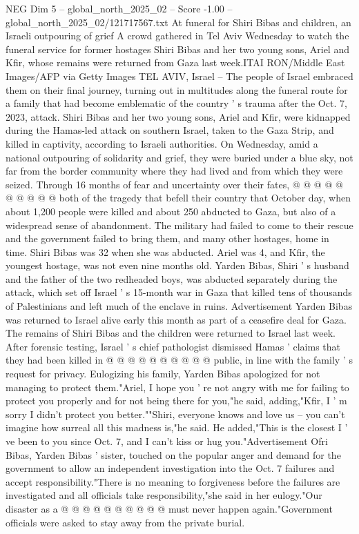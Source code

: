 \begin{textsample}{NEG Dim 5 – global\_north\_2025\_02 – Score -1.00 – global\_north\_2025\_02/121717567.txt}  \label{ex:f5_neg_129}
At funeral for Shiri Bibas and children, an Israeli outpouring of grief A crowd gathered in Tel Aviv Wednesday to watch the funeral service for former hostages Shiri Bibas and her two young sons, Ariel and Kfir, whose remains were returned from Gaza last week.ITAI RON/Middle East Images/AFP via Getty Images TEL AVIV, Israel -- The people of Israel embraced them on their final journey, turning out in multitudes along the funeral route for a family that had become emblematic of the country ' s trauma after the Oct. 7, 2023, attack.
Shiri Bibas and her two young sons, Ariel and Kfir, were kidnapped during the Hamas-led attack on southern Israel, taken to the Gaza Strip, and killed in captivity, according to Israeli authorities.
On Wednesday, amid a national outpouring of solidarity and grief, they were buried under a blue sky, not far from the border community where they had lived and from which they were seized.
Through 16 months of fear and uncertainty over their fates, @ @ @ @ @ @ @ @ @ @ both of the tragedy that befell their country that October day, when about 1,200 people were killed and about 250 abducted to Gaza, but also of a widespread sense of abandonment.
The military had failed to come to their rescue and the government failed to bring them, and many other hostages, home in time.
Shiri Bibas was 32 when she was abducted.
Ariel was 4, and Kfir, the youngest hostage, was not even nine months old.
Yarden Bibas, Shiri ' s husband and the father of the two redheaded boys, was abducted separately during the attack, which set off Israel ' s 15-month war in Gaza that killed tens of thousands of Palestinians and left much of the enclave in ruins.
Advertisement Yarden Bibas was returned to Israel alive early this month as part of a ceasefire deal for Gaza.
The remains of Shiri Bibas and the children were returned to Israel last week.
After forensic testing, Israel ' s chief pathologist dismissed Hamas ' claims that they had been killed in @ @ @ @ @ @ @ @ @ @ public, in line with the family ' s request for privacy.
Eulogizing his family, Yarden Bibas apologized for not managing to protect them."Ariel, I hope you ' re not angry with me for failing to protect you properly and for not being there for you,"he said, adding,"Kfir, I ' m sorry I didn't protect you better.""Shiri, everyone knows and love us -- you can't imagine how surreal all this madness is,"he said.
He added,"This is the closest I ' ve been to you since Oct. 7, and I can't kiss or hug you."Advertisement Ofri Bibas, Yarden Bibas ' sister, touched on the popular anger and demand for the government to allow an independent investigation into the Oct. 7 failures and accept responsibility."There is no meaning to forgiveness before the failures are investigated and all officials take responsibility,"she said in her eulogy."Our disaster as a @ @ @ @ @ @ @ @ @ @ must never happen again."Government officials were asked to stay away from the private burial.

\end{textsample}
